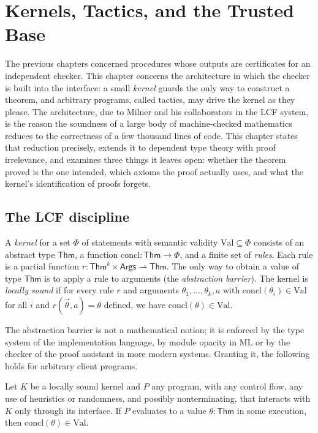 \chapter{Kernels, Tactics, and the Trusted Base}
\label{ch:kernels}

The previous chapters concerned procedures whose outputs are certificates for an independent checker. This chapter concerns the architecture in which the checker is built into the interface: a small \emph{kernel} guards the only way to construct a theorem, and arbitrary programs, called tactics, may drive the kernel as they please. The architecture, due to Milner and his collaborators in the LCF system, is the reason the soundness of a large body of machine-checked mathematics reduces to the correctness of a few thousand lines of code. This chapter states that reduction precisely, extends it to dependent type theory with proof irrelevance, and examines three things it leaves open: whether the theorem proved is the one intended, which axioms the proof actually uses, and what the kernel's identification of proofs forgets.

\section{The LCF discipline}
\label{sec:lcf}

\begin{definition}[Kernel]
\label{def:kernel}
A \emph{kernel} for a set $\Phi$ of statements with semantic validity $\mathrm{Val}\subseteq\Phi$ consists of an abstract type $\mathsf{Thm}$, a function $\mathrm{concl}:\mathsf{Thm}\to\Phi$, and a finite set of \emph{rules}. Each rule is a partial function $r:\mathsf{Thm}^{k}\times\mathsf{Args}\rightharpoonup\mathsf{Thm}$. The only way to obtain a value of type $\mathsf{Thm}$ is to apply a rule to arguments (the \emph{abstraction barrier}). The kernel is \emph{locally sound} if for every rule $r$ and arguments $\theta_1,\dots,\theta_k,a$ with $\mathrm{concl}(\theta_i)\in\mathrm{Val}$ for all $i$ and $r(\vec\theta,a)=\theta$ defined, we have $\mathrm{concl}(\theta)\in\mathrm{Val}$.
\end{definition}

The abstraction barrier is not a mathematical notion; it is enforced by the type system of the implementation language, by module opacity in ML or by the checker of the proof assistant in more modern systems. Granting it, the following holds for arbitrary client programs.

\begin{theorem}
\label{thm:lcf}
Let $K$ be a locally sound kernel and $P$ any program, with any control flow, any use of heuristics or randomness, and possibly nonterminating, that interacts with $K$ only through its interface. If $P$ evaluates to a value $\theta:\mathsf{Thm}$ in some execution, then $\mathrm{concl}(\theta)\in\mathrm{Val}$.
\end{theorem}

